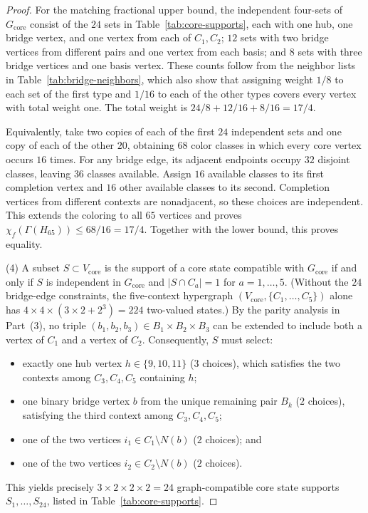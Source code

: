 \documentclass[
  aps,
  pra,
  reprint,
  superscriptaddress,
  amsmath,
  amssymb,
  nofootinbib,
  floatfix
]{revtex4-2}
\theoremstyle{definition}
\theoremstyle{remark}
\begin{document}
\begin{proof}
For the matching fractional upper bound, the independent four-sets of $G_{\mathrm{core}}$ consist of the $24$ sets in Table~\ref{tab:core-supports}, each with one hub, one bridge vertex, and one vertex from each of $C_1,C_2$; $12$ sets with two bridge vertices from different pairs and one vertex from each basis; and $8$ sets with three bridge vertices and one basis vertex. These counts follow from the neighbor lists in Table~\ref{tab:bridge-neighbors}, which also show that assigning weight $1/8$ to each set of the first type and $1/16$ to each of the other types covers every vertex with total weight one. The total weight is $24/8+12/16+8/16=17/4$.

Equivalently, take two copies of each of the first $24$ independent sets and one copy of each of the other $20$, obtaining $68$ color classes in which every core vertex occurs $16$ times. For any bridge edge, its adjacent endpoints occupy $32$ disjoint classes, leaving $36$ classes available. Assign $16$ available classes to its first completion vertex and $16$ other available classes to its second. Completion vertices from different contexts are nonadjacent, so these choices are independent. This extends the coloring to all $65$ vertices and proves $\chi_f(\Gamma(H_{65}))\le68/16=17/4$. Together with the lower bound, this proves equality.


(4) A subset $S\subset V_{\mathrm{core}}$ is the support of a core state compatible with $G_{\mathrm{core}}$ if and only if $S$ is independent in $G_{\mathrm{core}}$ and $|S\cap C_a|=1$ for $a=1,\ldots,5$. (Without the $24$ bridge-edge constraints, the five-context hypergraph $(V_{\mathrm{core}},\{C_1,\ldots,C_5\})$ alone has $4\times 4\times(3\times 2+2^3)=224$ two-valued states.) By the parity analysis in Part~(3), no triple $(b_1,b_2,b_3)\in B_1\times B_2\times B_3$ can be extended to include both a vertex of $C_1$ and a vertex of $C_2$. Consequently, $S$ must select:
\begin{itemize}
\item exactly one hub vertex $h\in\{9,10,11\}$ ($3$ choices), which satisfies the two contexts among $C_3,C_4,C_5$ containing $h$;
\item one binary bridge vertex $b$ from the unique remaining pair $B_k$ ($2$ choices), satisfying the third context among $C_3,C_4,C_5$;
\item one of the two vertices $i_1\in C_1\setminus N(b)$ ($2$ choices); and
\item one of the two vertices $i_2\in C_2\setminus N(b)$ ($2$ choices).
\end{itemize}
This yields precisely $3\times 2\times 2\times 2=24$ graph-compatible core state supports $S_1,\ldots,S_{24}$, listed in Table~\ref{tab:core-supports}.


\end{proof}
\end{document}
